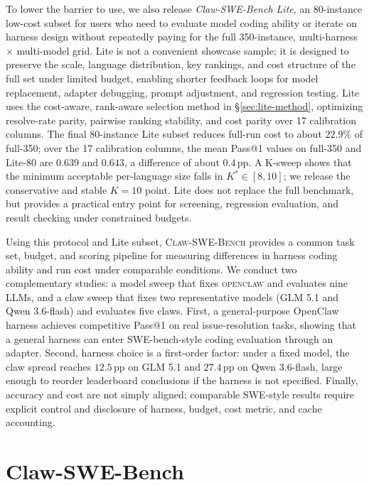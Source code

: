 \documentclass{llmxive}
\begin{document}
To lower the barrier to use, we also release \emph{Claw-SWE-Bench Lite}, an 80-instance low-cost subset for users who need to evaluate model coding ability or iterate on harness design without repeatedly paying for the full 350-instance, multi-harness $\times$ multi-model grid. Lite is not a convenient showcase sample; it is designed to preserve the scale, language distribution, key rankings, and cost structure of the full set under limited budget, enabling shorter feedback loops for model replacement, adapter debugging, prompt adjustment, and regression testing. Lite uses the cost-aware, rank-aware selection method in \S\ref{sec:lite-method}, optimizing resolve-rate parity, pairwise ranking stability, and cost parity over 17 calibration columns. The final 80-instance Lite subset reduces full-run cost to about $22.9\%$ of full-350; over the 17 calibration columns, the mean Pass@1 values on full-350 and Lite-80 are $0.639$ and $0.643$, a difference of about $0.4$\,pp. A K-sweep shows that the minimum acceptable per-language size falls in $K^*\in[8,10]$; we release the conservative and stable $K{=}10$ point. Lite does not replace the full benchmark, but provides a practical entry point for screening, regression evaluation, and result checking under constrained budgets.

Using this protocol and Lite subset, \textsc{Claw-SWE-Bench} provides a common task set, budget, and scoring pipeline for measuring differences in harness coding ability and run cost under comparable conditions. We conduct two complementary studies: a model sweep that fixes \textsc{openclaw} and evaluates nine LLMs, and a claw sweep that fixes two representative models (GLM 5.1 and Qwen 3.6-flash) and evaluates five claws. First, a general-purpose OpenClaw harness achieves competitive Pass@1 on real issue-resolution tasks, showing that a general harness can enter SWE-bench-style coding evaluation through an adapter. Second, harness choice is a first-order factor: under a fixed model, the claw spread reaches $12.5$\,pp on GLM 5.1 and $27.4$\,pp on Qwen 3.6-flash, large enough to reorder leaderboard conclusions if the harness is not specified. Finally, accuracy and cost are not simply aligned; comparable SWE-style results require explicit control and disclosure of harness, budget, cost metric, and cache accounting.

\section{Claw-SWE-Bench}
\label{sec:claw_swe_bench}
\end{document}
